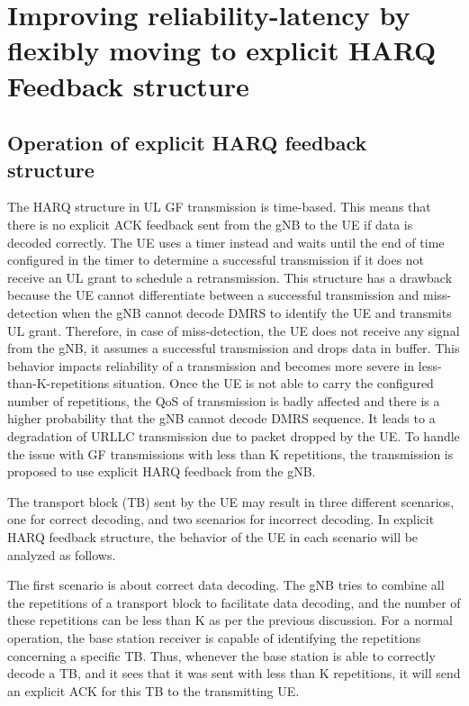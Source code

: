 \documentclass[conference]{IEEEtran}
\begin{document}
\section{Improving reliability-latency by flexibly moving to explicit HARQ Feedback structure}\label{II}

\subsection{Operation of explicit HARQ feedback structure}\label{IIAA}

The HARQ structure in UL GF transmission is time-based. This means that there is no explicit ACK feedback sent from the gNB to the UE if data is decoded correctly. The UE uses a timer instead and waits until the end of time configured in the timer to determine a successful transmission if it does not receive an UL grant to schedule a retransmission. This structure has a drawback because the UE cannot differentiate between a successful transmission and miss-detection when the gNB cannot decode DMRS to identify the UE and transmits UL grant. Therefore, in case of miss-detection, the UE does not receive any signal from the gNB, it assumes a successful transmission and drops data in buffer. This behavior impacts reliability of a transmission and becomes more severe in less-than-K-repetitions situation. Once the UE is not able to carry the configured number of repetitions, the QoS of transmission is badly affected and there is a higher probability that the gNB cannot decode DMRS sequence. It leads to a degradation of URLLC transmission due to packet dropped by the UE. To handle the issue with GF transmissions with less than K repetitions, the transmission is proposed to use explicit HARQ feedback from the gNB. 

The transport block (TB) sent by the UE may result in three different scenarios, one for correct decoding, and two scenarios for incorrect decoding. In explicit HARQ feedback structure, the behavior of the UE in each scenario will be analyzed as follows. 

The first scenario is about correct data decoding. The gNB tries to combine all the repetitions of a transport block to facilitate data decoding, and the number of these repetitions can be less than K as per the previous discussion. For a normal operation, the base station receiver is capable of identifying the repetitions concerning a specific TB. Thus, whenever the base station is able to correctly decode a TB, and it sees that it was sent with less than K repetitions, it will send an explicit ACK for this TB to the transmitting UE.
\end{document}
